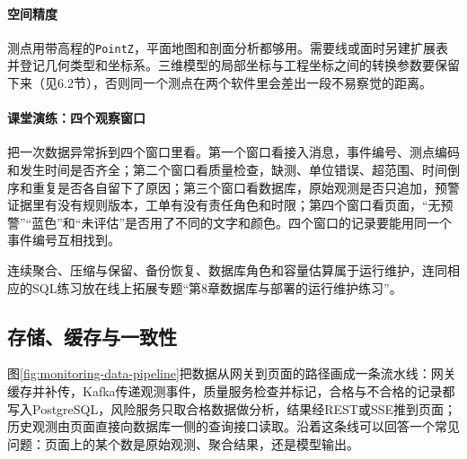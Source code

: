 \paragraph{空间精度}测点用带高程的\texttt{PointZ}，平面地图和剖面分析都够用。需要线或面时另建扩展表并登记几何类型和坐标系。三维模型的局部坐标与工程坐标之间的转换参数要保留下来（见6.2节），否则同一个测点在两个软件里会差出一段不易察觉的距离。

\paragraph{课堂演练：四个观察窗口}把一次数据异常拆到四个窗口里看。第一个窗口看接入消息，事件编号、测点编码和发生时间是否齐全；第二个窗口看质量检查，缺测、单位错误、超范围、时间倒序和重复是否各自留下了原因；第三个窗口看数据库，原始观测是否只追加，预警证据里有没有规则版本，工单有没有责任角色和时限；第四个窗口看页面，“无预警”“蓝色”和“未评估”是否用了不同的文字和颜色。四个窗口的记录要能用同一个事件编号互相找到。

连续聚合、压缩与保留、备份恢复、数据库角色和容量估算属于运行维护，连同相应的SQL练习放在线上拓展专题“第8章数据库与部署的运行维护练习”。

\subsection{存储、缓存与一致性}

图\ref{fig:monitoring-data-pipeline}把数据从网关到页面的路径画成一条流水线：网关缓存并补传，Kafka传递观测事件，质量服务检查并标记，合格与不合格的记录都写入PostgreSQL，风险服务只取合格数据做分析，结果经REST或SSE推到页面；历史观测由页面直接向数据库一侧的查询接口读取。沿着这条线可以回答一个常见问题：页面上的某个数是原始观测、聚合结果，还是模型输出。

